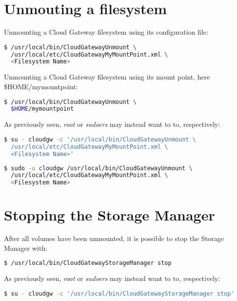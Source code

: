 \documentclass[11pt,fleqn,openany]{book} %
\begin{document}
\section{Unmouting a filesystem}
\label{sec:unmouting-a-filesystem}

Unmounting a Cloud Gateway filesystem using its configuration file:\\
\begin{lstlisting}[language=bash]
$ /usr/local/bin/CloudGatewayUnmount \
  /usr/local/etc/CloudGatewayMyMountPoint.xml \
  <Filesystem Name>
\end{lstlisting}

Unmounting a Cloud Gateway filesystem using its mount point, here \$HOME/mymountpoint:\\
\begin{lstlisting}[language=bash]
$ /usr/local/bin/CloudGatewayUnmount \
  $HOME/mymountpoint
\end{lstlisting}

As previously seen, \textit{root} or \textit{sudoers} may instead want to to, respectively:\\

\begin{lstlisting}[language=bash]
$ su - cloudgw -c '/usr/local/bin/CloudGatewayUnmount \
  /usr/local/etc/CloudGatewayMyMountPoint.xml \
  <Filesystem Name>'
\end{lstlisting}

\begin{lstlisting}[language=bash]
$ sudo -u cloudgw /usr/local/bin/CloudGatewayUnmount \
  /usr/local/etc/CloudGatewayMyMountPoint.xml \
  <Filesystem Name>
\end{lstlisting}

\section{Stopping the Storage Manager}
\label{sec:stopping-the-storage-manager}

After all volumes have been unmounted, it is possible to stop the Storage Manager with:\\
\begin{lstlisting}[language=bash]
$ /usr/local/bin/CloudGatewayStorageManager stop
\end{lstlisting}

As previously seen, \textit{root} or \textit{sudoers} may instead want to to, respectively:\\

\begin{lstlisting}[language=bash]
$ su - cloudgw -c '/usr/local/bin/CloudGatewayStorageManager stop'
\end{lstlisting}
\end{document}

